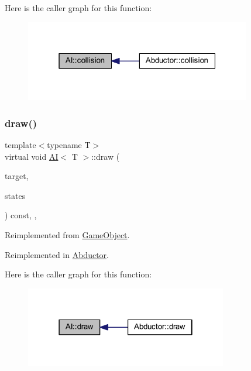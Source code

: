 Here is the caller graph for this function\+:
\nopagebreak
\begin{figure}[H]
\begin{center}
\leavevmode
\includegraphics[width=280pt]{class_a_i_a15f7ffd56bf48c7475f9b50d82b60528_icgraph}
\end{center}
\end{figure}
\mbox{\label{class_a_i_a8a7423a8612cfd777f3b5eeae4764d50}} 
\subsubsection{\texorpdfstring{draw()}{draw()}}
{\footnotesize\ttfamily template$<$typename T$>$ \\
virtual void \hyperlink{class_a_i}{AI}$<$ T $>$\+::draw (\begin{DoxyParamCaption}\item[{sf\+::\+Render\+Target \&}]{target,  }\item[{sf\+::\+Render\+States}]{states }\end{DoxyParamCaption}) const\hspace{0.3cm}{\ttfamily [inline]}, {\ttfamily [override]}, {\ttfamily [virtual]}}



Reimplemented from \hyperlink{class_game_object_aa6d7650a920e2dd79b0125560faf3807}{Game\+Object}.



Reimplemented in \hyperlink{class_abductor_aebaf5c5a2882f41c8e1ed1b18f80e3d1}{Abductor}.

Here is the caller graph for this function\+:
\nopagebreak
\begin{figure}[H]
\begin{center}
\leavevmode
\includegraphics[width=250pt]{class_a_i_a8a7423a8612cfd777f3b5eeae4764d50_icgraph}
\end{center}
\end{figure}
\mbox{\label{class_a_i_ac705298af197a4e87594ee095bfceb60}} 
